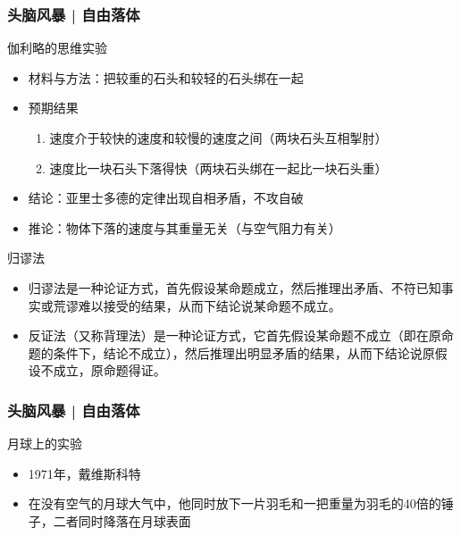 \begin{frame}
  \frametitle{头脑风暴 | 自由落体}
  \begin{block}{伽利略的思维实验}
    \begin{itemize}
      \item 材料与方法：把较重的石头和较轻的石头绑在一起
      \pause
      \item 预期结果
        \begin{enumerate}
          \item 速度介于较快的速度和较慢的速度之间（两块石头互相掣肘）
          \item 速度比一块石头下落得快（两块石头绑在一起比一块石头重）
        \end{enumerate}
      \item 结论：亚里士多德的定律出现自相矛盾，不攻自破
      \item 推论：物体下落的速度与其重量无关（与空气阻力有关）
    \end{itemize}
  \end{block}
  \pause
  \begin{block}{\alert{归谬法}}
    \begin{itemize}
      \item 归谬法是一种论证方式，首先假设某命题成立，然后推理出矛盾、不符已知事实或荒谬难以接受的结果，从而下结论说某命题不成立。
      \item 反证法（又称背理法）是一种论证方式，它首先假设某命题不成立（即在原命题的条件下，结论不成立），然后推理出明显矛盾的结果，从而下结论说原假设不成立，原命题得证。
    \end{itemize}
  \end{block}
\end{frame}

\begin{frame}
  \frametitle{头脑风暴 | 自由落体}
  \begin{block}{月球上的实验}
    \begin{itemize}
      \item 1971年，戴维\textbullet 斯科特
      \item 在没有空气的月球大气中，他同时放下一片羽毛和一把重量为羽毛的40倍的锤子，二者同时降落在月球表面
    \end{itemize}
  \end{block}
\end{frame}

